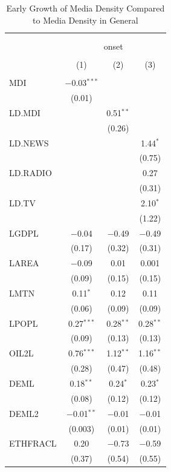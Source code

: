 \documentclass[11pt,article,oneside]{memoir}
\begin{document}
\begin{table}[!htbp] \centering 
  \caption{Early Growth of Media Density Compared to Media Density in General} 
  \label{} 
\footnotesize 
\begin{tabular}{@{\extracolsep{5pt}}lccc} 
\\[-1.8ex]\hline \\[-1.8ex] 
\\[-1.8ex] & \multicolumn{3}{c}{onset} \\ 
\\[-1.8ex] & (1) & (2) & (3)\\ 
\hline \\[-1.8ex] 
 MDI & $-$0.03$^{***}$ &  &  \\ 
  & (0.01) &  &  \\ 
  LD.MDI &  & 0.51$^{**}$ &  \\ 
  &  & (0.26) &  \\ 
  LD.NEWS &  &  & 1.44$^{*}$ \\ 
  &  &  & (0.75) \\ 
  LD.RADIO &  &  & 0.27 \\ 
  &  &  & (0.31) \\ 
  LD.TV &  &  & 2.10$^{*}$ \\ 
  &  &  & (1.22) \\ 
  LGDPL & $-$0.04 & $-$0.49 & $-$0.49 \\ 
  & (0.17) & (0.32) & (0.31) \\ 
  LAREA & $-$0.09 & 0.01 & 0.001 \\ 
  & (0.09) & (0.15) & (0.15) \\ 
  LMTN & 0.11$^{*}$ & 0.12 & 0.11 \\ 
  & (0.06) & (0.09) & (0.09) \\ 
  LPOPL & 0.27$^{***}$ & 0.28$^{**}$ & 0.28$^{**}$ \\ 
  & (0.09) & (0.13) & (0.13) \\ 
  OIL2L & 0.76$^{***}$ & 1.12$^{**}$ & 1.16$^{**}$ \\ 
  & (0.28) & (0.47) & (0.48) \\ 
  DEML & 0.18$^{**}$ & 0.24$^{*}$ & 0.23$^{*}$ \\ 
  & (0.08) & (0.12) & (0.12) \\ 
  DEML2 & $-$0.01$^{**}$ & $-$0.01 & $-$0.01 \\ 
  & (0.003) & (0.01) & (0.01) \\ 
  ETHFRACL & 0.20 & $-$0.73 & $-$0.59 \\ 
  & (0.37) & (0.54) & (0.55) \\ 

\end{tabular}
\end{table}
\end{document}

